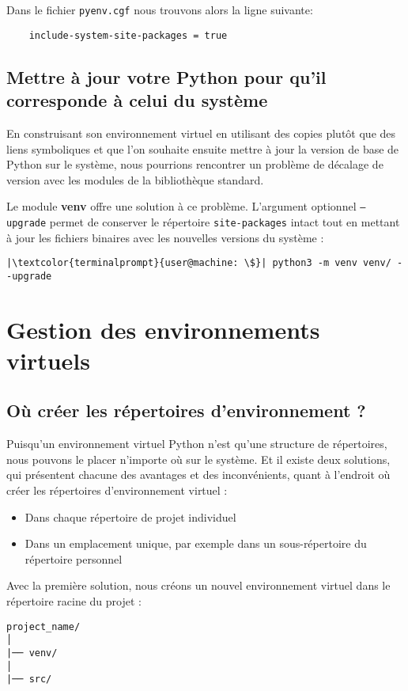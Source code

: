 Dans le fichier \texttt{pyenv.cgf} nous trouvons alors la ligne suivante:
\begin{verbatim}
    include-system-site-packages = true
\end{verbatim}

\subsection*{Mettre à jour votre Python pour qu'il corresponde à celui du système}
En construisant son environnement virtuel en utilisant des copies plutôt que des liens symboliques et que l'on souhaite ensuite mettre à jour la version de base de Python sur le système, nous pourrions rencontrer un problème de décalage de version avec les modules de la bibliothèque standard.

Le module \textbf{venv} offre une solution à ce problème. L'argument optionnel \texttt{--upgrade} permet de conserver le répertoire \texttt{site-packages} intact tout en mettant à jour les fichiers binaires avec les nouvelles versions du système :
\begin{lstlisting}[style=terminal]
|\textcolor{terminalprompt}{user@machine: \$}| python3 -m venv venv/ --upgrade
\end{lstlisting}

\section{Gestion des environnements virtuels}
\subsection*{Où créer les répertoires d'environnement ?}
Puisqu'un environnement virtuel Python n'est qu'une structure de répertoires, nous pouvons le placer n'importe où sur le système. Et il existe deux solutions, qui présentent chacune des avantages et des inconvénients, quant à l'endroit où créer les répertoires d'environnement virtuel :

\begin{itemize}
    \item Dans chaque répertoire de projet individuel
    \item Dans un emplacement unique, par exemple dans un sous-répertoire du répertoire personnel
\end{itemize}

Avec la première solution, nous créons un nouvel environnement virtuel dans le répertoire racine du projet :
\begin{verbatim}
project_name/
│
|── venv/
│
|── src/
\end{verbatim}

